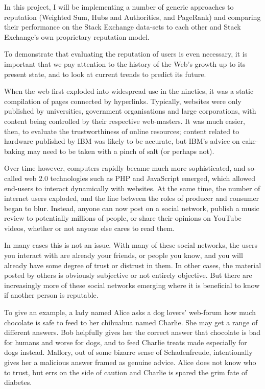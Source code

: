 \documentclass[]{final_report}
\begin{document}
In this project, I will be implementing a number of generic approaches to reputation (Weighted Sum, Hubs and Authorities, and PageRank) and comparing their performance on the Stack Exchange data-sets to each other and Stack Exchange's own proprietary reputation model.

To demonstrate that evaluating the reputation of users is even necessary, it is important that we pay attention to the history of the Web's growth up to its present state, and to look at current trends to predict its future.

When the web first exploded into widespread use in the nineties, it was a static compilation of pages connected by hyperlinks. Typically, websites were only published by universities, government organisations and large corporations, with content being controlled by their respective web-masters. It was much easier, then, to evaluate the trustworthiness of online resources; content related to hardware published by IBM was likely to be accurate, but IBM's advice on cake-baking may need to be taken with a pinch of salt (or perhaps not).

Over time however, computers rapidly became much more sophisticated, and so-called web 2.0 technologies such as PHP and JavaScript emerged, which allowed end-users to interact dynamically with websites. At the same time, the number of internet users exploded, and the line between the roles of producer and consumer began to blur. Instead, anyone can now post on a social network, publish a music review to potentially millions of people, or share their opinions on YouTube videos, whether or not anyone else cares to read them.

In many cases this is not an issue. With many of these social networks, the users you interact with are already your friends, or people you know, and you will already have some degree of trust or distrust in them. In other cases, the material posted by others is obviously subjective or not entirely objective. But there are increasingly more of these social networks emerging where it is beneficial to know if another person is reputable.

To give an example, a lady named Alice asks a dog lovers' web-forum how much chocolate is safe to feed to her chihuahua named Charlie. She may get a range of different answers. Bob helpfully gives her the correct answer that chocolate is bad for humans and worse for dogs, and to feed Charlie treats made especially for dogs instead. Mallory, out of some bizarre sense of Schadenfreude, intentionally gives her a malicious answer framed as genuine advice. Alice does not know who to trust, but errs on the side of caution and Charlie is spared the grim fate of diabetes.
\end{document}

